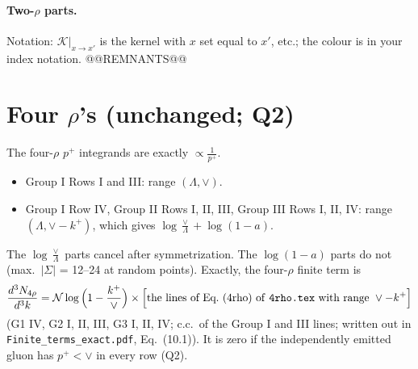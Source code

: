 \documentclass[10pt]{article}
\numberwithin{equation}{section}
\newcommand{\KK}{\mathcal K}
\newcommand{\NN}{\mathcal N}
\begin{document}
\paragraph{Two-$\rho$ parts.} Notation: $\KK|_{x\to x'}$ is the kernel with $x$ set equal to $x'$, etc.; the colour is in your index notation.
@@REMNANTS@@

\section{Four \texorpdfstring{$\rho$}{rho}'s (unchanged; Q2)}\label{sec:four}
The four-$\rho$ $p^+$ integrands are exactly $\propto\frac1{p^+}$.
\begin{itemize}
\item Group I Rows I and III: range $(\Lambda,\vee)$.
\item Group I Row IV, Group II Rows I, II, III, Group III Rows I, II, IV: range $(\Lambda,\vee-k^+)$, which gives $\log\frac\vee\Lambda+\log(1-a)$.
\end{itemize}
The $\log\frac\vee\Lambda$ parts cancel after symmetrization. The $\log(1-a)$ parts do not (max.\ $|\Sigma|$ = 12--24 at random points). Exactly, the four-$\rho$ finite term is
\begin{equation}
\frac{d^3N_{4\rho}}{d^3k}=\NN\log\Big(1-\frac{k^+}{\vee}\Big)\times\Big[\text{the lines of Eq.~(4rho) of \texttt{4rho.tex} with range }\vee-k^+\Big]
\label{eq:four}
\end{equation}
(G1 IV, G2 I, II, III, G3 I, II, IV; c.c.\ of the Group I and III lines; written out in \texttt{Finite\_terms\_exact.pdf}, Eq.~(10.1)). It is zero if the independently emitted gluon has $p^+<\vee$ in every row (Q2).

\end{document}
